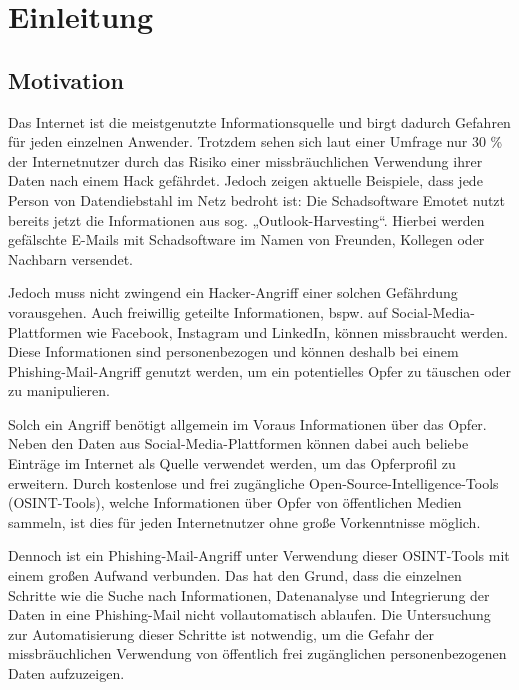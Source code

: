 \chapter{Einleitung}
\label{cha:einleitung}

\section{Motivation}
Das Internet ist die meistgenutzte Informationsquelle und birgt dadurch Gefahren für jeden einzelnen Anwender.  \cite{Inforamtionsquellen} Trotzdem sehen sich laut einer Umfrage nur 30 \% der Internetnutzer durch das Risiko einer missbräuchlichen Verwendung ihrer Daten nach einem Hack gefährdet. \cite{AngstDatendiebstahl} Jedoch zeigen aktuelle Beispiele, dass jede Person von Datendiebstahl im Netz bedroht ist: Die Schadsoftware Emotet nutzt bereits jetzt die Informationen aus sog. „Outlook-Harvesting“. Hierbei werden gefälschte E-Mails mit Schadsoftware im Namen von Freunden, Kollegen oder Nachbarn versendet. \cite{bsiEmotet}

Jedoch muss nicht zwingend ein Hacker-Angriff einer solchen Gefährdung vorausgehen. Auch freiwillig geteilte Informationen, bspw. auf Social-Media-Plattformen wie Facebook, Instagram und LinkedIn, können missbraucht werden. Diese Informationen sind personenbezogen und können deshalb bei einem Phishing-Mail-Angriff genutzt werden, um ein potentielles Opfer zu täuschen oder zu manipulieren.

Solch ein Angriff benötigt allgemein im Voraus Informationen über das Opfer.  Neben den Daten aus Social-Media-Plattformen können dabei auch beliebe Einträge im Internet als Quelle verwendet werden, um das Opferprofil zu erweitern. Durch kostenlose und frei zugängliche Open-Source-Intelligence-Tools (OSINT-Tools), welche Informationen über Opfer von öffentlichen Medien sammeln, ist dies für jeden Internetnutzer ohne große Vorkenntnisse möglich. 

Dennoch ist ein Phishing-Mail-Angriff unter Verwendung dieser OSINT-Tools mit einem großen Aufwand verbunden. Das hat den Grund, dass die einzelnen Schritte wie die Suche nach Informationen, Datenanalyse und Integrierung der Daten in eine Phishing-Mail nicht vollautomatisch ablaufen. Die Untersuchung zur Automatisierung dieser Schritte ist notwendig, um die Gefahr der missbräuchlichen Verwendung von öffentlich frei zugänglichen personenbezogenen Daten aufzuzeigen.

